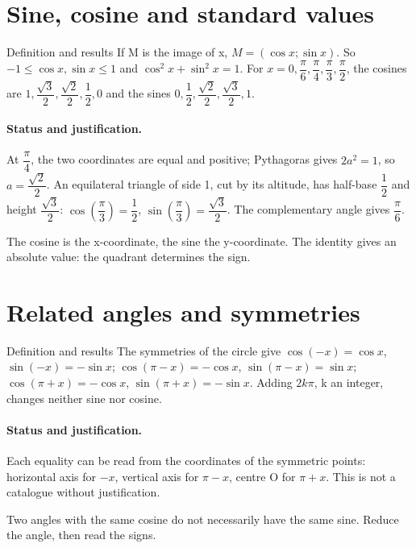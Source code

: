 \section{Sine, cosine and standard values}\label{C10-U3}
\begin{repere}{Definition and results}
If M is the image of x, $M=(\cos x;\sin x)$. So $-1\leq\cos x,\sin x\leq1$ and $\cos^2x+\sin^2x=1$. For $x=0,\dfrac{\pi}{6},\dfrac{\pi}{4},\dfrac{\pi}{3},\dfrac{\pi}{2}$, the cosines are $1,\dfrac{\sqrt 3}{2},\dfrac{\sqrt 2}{2},\dfrac{1}{2},0$ and the sines $0,\dfrac{1}{2},\dfrac{\sqrt 2}{2},\dfrac{\sqrt 3}{2},1$.
\end{repere}
\paragraph{Status and justification.} At $\dfrac{\pi}{4}$, the two coordinates are equal and positive; Pythagoras gives $2a^2=1$, so $a=\dfrac{\sqrt 2}{2}$. An equilateral triangle of side 1, cut by its altitude, has half-base $\dfrac{1}{2}$ and height $\dfrac{\sqrt 3}{2}$: $\cos (\dfrac{\pi}{3})=\dfrac{1}{2}$, $\sin (\dfrac{\pi}{3})=\dfrac{\sqrt 3}{2}$. The complementary angle gives $\dfrac{\pi}{6}$.
\label{C10-EX3}

\begin{erreur}The cosine is the x-coordinate, the sine the y-coordinate. The identity gives an absolute value: the quadrant determines the sign.\end{erreur}
\label{C10-AP3}
\section{Related angles and symmetries}\label{C10-U4}
\begin{repere}{Definition and results}
The symmetries of the circle give $\cos(-x)=\cos x$, $\sin(-x)=-\sin x$; $\cos(\pi-x)=-\cos x$, $\sin(\pi-x)=\sin x$; $\cos(\pi+x)=-\cos x$, $\sin(\pi+x)=-\sin x$. Adding $2k\pi$, k an integer, changes neither sine nor cosine.
\end{repere}
\paragraph{Status and justification.} Each equality can be read from the coordinates of the symmetric points: horizontal axis for $-x$, vertical axis for $\pi-x$, centre O for $\pi+x$. This is not a catalogue without justification.
\label{C10-EX4}
\begin{erreur}Two angles with the same cosine do not necessarily have the same sine. Reduce the angle, then read the signs.\end{erreur}
\label{C10-AP4}
